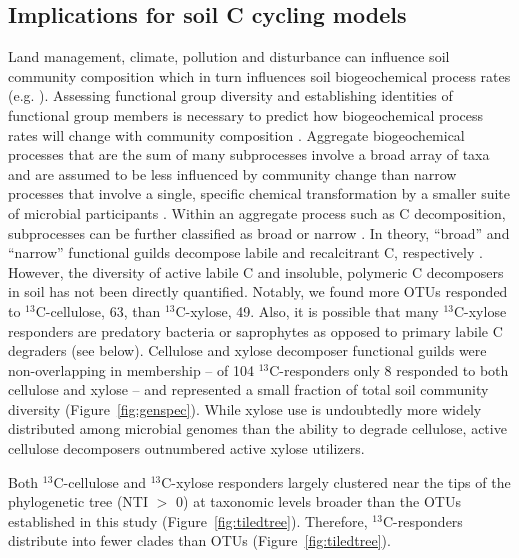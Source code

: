 \subsection{Implications for soil C cycling models}
Land management, climate, pollution and disturbance can influence soil
community composition \citep{McGuire2010} which in turn influences soil
biogeochemical process rates (e.g. \citep{Berlemont2014a}). Assessing
functional group diversity and establishing identities of functional group
members is necessary to predict how biogeochemical process rates will change
with community composition \citep{Schimel_1995,McGuire2010}. Aggregate
biogeochemical processes that are the sum of many subprocesses involve a broad
array of taxa and are assumed to be less influenced by community change than
narrow processes that involve a single, specific chemical transformation by
a smaller suite of microbial participants \citep{Schimel_1995,McGuire2010}.
Within an aggregate process such as C decomposition, subprocesses can be
further classified as broad or narrow \citep{McGuire2010}. In theory,
``broad'' and ``narrow'' functional guilds decompose labile and
recalcitrant C, respectively \citep{McGuire2010}. However, the diversity
of active labile C and insoluble, polymeric C decomposers in soil has not
been directly quantified. Notably, we found more OTUs responded to
$^{13}$C-cellulose, 63, than $^{13}$C-xylose, 49. Also, it is possible that
many $^{13}$C-xylose responders are predatory bacteria or saprophytes as
opposed to primary labile C degraders (see below). Cellulose and xylose
decomposer functional guilds were non-overlapping in membership -- of
104 $^{13}$C-responders only 8 responded to both cellulose and xylose -- and
represented a small fraction of total soil community diversity
(Figure~\ref{fig:genspec}). While xylose use is undoubtedly more widely
distributed among microbial genomes than the ability to degrade cellulose,
active cellulose decomposers outnumbered active xylose utilizers.

Both $^{13}$C-cellulose and $^{13}$C-xylose responders largely clustered
near the tips of the phylogenetic tree (NTI $>$ 0) at taxonomic levels broader
than the OTUs established in this study (Figure~\ref{fig:tiledtree}).
Therefore, $^{13}$C-responders distribute into fewer clades than OTUs
(Figure~\ref{fig:tiledtree}). 

